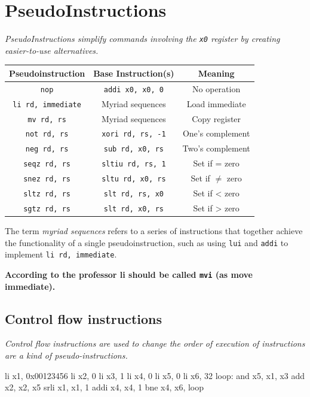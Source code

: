 \section{PseudoInstructions}
\textit{PseudoInstructions simplify commands involving the \texttt{x0} register by creating easier-to-use alternatives.} \newline
\begin{center}
        \begin{tabular}{|c|c|c|}
        \hline
        \textbf{Pseudoinstruction} & \textbf{Base Instruction(s)} & \textbf{Meaning} \\ \hline
        \texttt{nop}               & \texttt{addi x0, x0, 0}      & No operation     \\ \hline
        \texttt{li rd, immediate}  & Myriad sequences             & Load immediate   \\ \hline
        \texttt{mv rd, rs}         & Myriad sequences             & Copy register    \\ \hline
        \texttt{not rd, rs}        & \texttt{xori rd, rs, -1}     & One's complement \\ \hline
        \texttt{neg rd, rs}        & \texttt{sub rd, x0, rs}      & Two's complement \\ \hline
        \texttt{seqz rd, rs}       & \texttt{sltiu rd, rs, 1}     & Set if = zero    \\ \hline
        \texttt{snez rd, rs}       & \texttt{sltu rd, x0, rs}     & Set if $\neq$ zero    \\ \hline
        \texttt{sltz rd, rs}       & \texttt{slt rd, rs, x0}      & Set if < zero    \\ \hline
        \texttt{sgtz rd, rs}       & \texttt{slt rd, x0, rs}      & Set if > zero    \\ \hline
        \end{tabular}
\end{center} 
The term \textit{myriad sequences} refers to a series of instructions that together achieve the functionality of a single pseudoinstruction, such as using \texttt{lui} and \texttt{addi} to implement \texttt{li rd, immediate}.

\textbf{According to the professor li should be called \texttt{mvi} (as move immediate).}

\subsection{Control flow instructions}
\textit{Control flow instructions are used to change the order of execution of instructions are a kind of pseudo-instructions.}
\begin{assembly}
    li x1, 0x00123456
    li x2, 0
    li x3, 1
    li x4, 0
    li x5, 0
    li x6, 32
loop: and x5, x1, x3
    add x2, x2, x5
    srli x1, x1, 1
    addi x4, x4, 1
    bne x4, x6, loop
\end{assembly}

